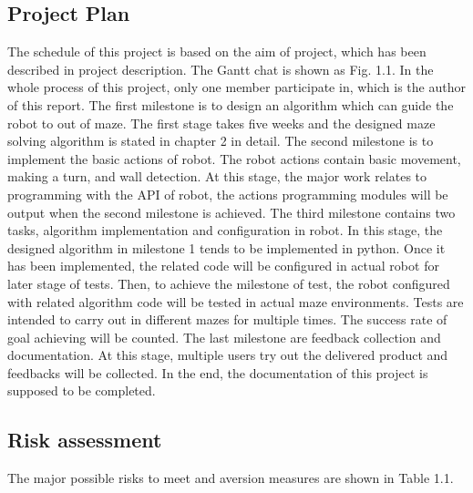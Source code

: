 \documentclass[11pt,times,oneside,openright,hardcopy]{eeereport}
\begin{document}
\subsection{Project Plan}
The schedule of this project is based on the aim of project, which has been described in project description. The Gantt chat is shown as Fig. 1.1. In the whole process of this project, only one member participate in, which is the author of this report.
The first milestone is to design an algorithm which can guide the robot to out of maze. The first stage takes five weeks and the designed maze solving algorithm is stated in chapter 2 in detail. 
The second milestone is to implement the basic actions of robot. The robot actions contain basic movement, making a turn, and wall detection. At this stage, the major work relates to programming with the API of robot, the actions programming modules will be output when the second milestone is achieved.
The third milestone contains two tasks, algorithm implementation and configuration in robot. In this stage, the designed algorithm in milestone 1 tends to be implemented in python. Once it has been implemented, the related code will be configured in actual robot for later stage of tests. 
Then, to achieve the milestone of test, the robot configured with related algorithm code will be tested in actual maze environments. Tests are intended to carry out in different mazes for multiple times. The success rate of goal achieving will be counted.
The last milestone are feedback collection and documentation. At this stage, multiple users try out the delivered product and feedbacks will be collected. In the end, the documentation of this project is supposed to be completed.

\subsection{Risk assessment}
The major possible risks to meet and aversion measures are shown in Table 1.1.
\end{document}
